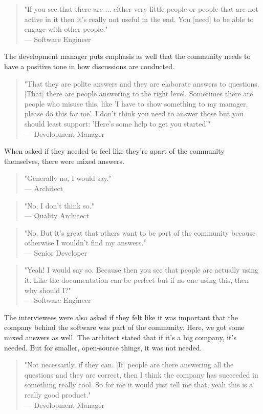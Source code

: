 \documentclass{cslthse-msc}
\begin{document}
    \begin{quote}
        "If you see that there are ... either very little people or people that are not active in it then it's really not useful in the end. You [need] to be able to engage with other people."\\--- Software Engineer
    \end{quote}
    The development manager puts emphasis as well that the community needs to have a positive tone in how discussions are conducted.
    \begin{quote}
        "That they are polite answers and they are elaborate answers to questions. [That] there are people answering to the right level. Sometimes there are people who misuse this, like 'I have to show something to my manager, please do this for me'. I don't think you need to answer those but you should least support: 'Here's some help to get you started'"\\--- Development Manager
    \end{quote}
    When asked if they needed to feel like they're apart of the community themselves, there were mixed answers.
    \begin{quote}
        "Generally no, I would say."\\ --- Architect
    \end{quote}
    \begin{quote}
        "No, I don't think so."\\--- Quality Architect
    \end{quote}
    \begin{quote}
        "No. But it's great that others want to be part of the community because otherwise I wouldn't find my answers."\\--- Senior Developer
    \end{quote}
    \begin{quote}
        "Yeah! I would say so. Because then you see that people are actually using it. Like the documentation can be perfect but if no one using this, then why should I?"\\--- Software Engineer
    \end{quote}
    The interviewees were also asked if they felt like it was important that the company behind the software was part of the community. Here, we got some mixed answers as well. The architect stated that if it's a big company, it's needed. But for smaller, open-source things, it was not needed.
    \begin{quote}
        "Not necessarily, if they can. [If] people are there answering all the questions and they are correct, then I think the company has succeeded in something really cool. So for me it would just tell me that, yeah this is a really good product."\\--- Development Manager
    \end{quote}
\end{document}
